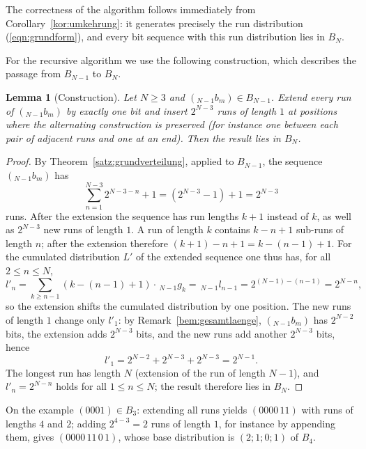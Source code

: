 \documentclass[11pt,a4paper]{scrartcl}
\theoremstyle{plain}
\newtheorem{lemma}[satz]{Lemma}
\theoremstyle{definition}
\theoremstyle{remark}
\begin{document}
\noindent The correctness of the algorithm follows immediately from
Corollary~\ref{kor:umkehrung}: it generates precisely the run
distribution (\ref{eqn:grundform}), and every bit sequence with this
run distribution lies in $B_N$.

\noindent For the recursive algorithm we use the following
construction, which describes the passage from $B_{N-1}$ to $B_N$.

\begin{lemma}[Construction]\label{lem:konstruktion}
Let $N\geq 3$ and $({}_{N-1}b_m)\in B_{N-1}$. Extend every run of
$({}_{N-1}b_m)$ by exactly one bit and insert $2^{N-3}$ runs of
length $1$ at positions where the alternating construction is
preserved (for instance one between each pair of adjacent runs and
one at an end). Then the result lies in $B_N$.
\end{lemma}

\begin{proof}
By Theorem~\ref{satz:grundverteilung}, applied to $B_{N-1}$, the
sequence $({}_{N-1}b_m)$ has
\begin{equation*}
  \sum_{n=1}^{N-3}2^{N-3-n}+1=\left(2^{N-3}-1\right)+1=2^{N-3}
\end{equation*}
runs. After the extension the sequence has run lengths $k+1$ instead
of $k$, as well as $2^{N-3}$ new runs of length $1$. A run of length
$k$ contains $k-n+1$ sub-runs of length $n$; after the extension
therefore $(k+1)-n+1=k-(n-1)+1$. For the cumulated distribution $L'$
of the extended sequence one thus has, for all $2\leq n\leq N$,
\begin{equation*}
  l'_n=\sum_{k\geq n-1}\left(k-(n-1)+1\right)\cdot\,_{N-1}g_k
  =\,_{N-1}l_{n-1}=2^{(N-1)-(n-1)}=2^{N-n},
\end{equation*}
so the extension shifts the cumulated distribution by one position.
The new runs of length $1$ change only $l'_1$: by
Remark~\ref{bem:gesamtlaenge}, $({}_{N-1}b_m)$ has $2^{N-2}$ bits,
the extension adds $2^{N-3}$ bits, and the new runs add another
$2^{N-3}$ bits, hence
\begin{equation*}
  l'_1=2^{N-2}+2^{N-3}+2^{N-3}=2^{N-1}.
\end{equation*}
The longest run has length $N$ (extension of the run of length
$N-1$), and $l'_n=2^{N-n}$ holds for all $1\leq n\leq N$; the result
therefore lies in $B_N$.
\end{proof}

\noindent On the example $(0001)\in B_3$: extending all runs yields
$(0000\,11)$ with runs of lengths $4$ and $2$; adding
$2^{4-3}=2$ runs of length $1$, for instance by appending them, gives
$(0000\,11\,0\,1)$, whose base distribution is $(2;1;0;1)$ of $B_4$.
\end{document}
